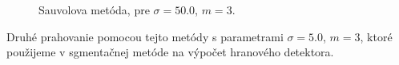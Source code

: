 \documentclass[a4paper,11pt,oneside]{article}%
\begin{document}
\begin{figure}[H]
    \hspace{5px}
    \caption{Sauvolova metóda, pre $\sigma = 50.0$, $m = 3$.}
    \label{fig:sauvola} 
\end{figure}

Druhé prahovanie pomocou tejto metódy s parametrami $\sigma = 5.0$, $m = 3$, ktoré použijeme v sgmentačnej metóde na výpočet hranového detektora.
\end{document}
